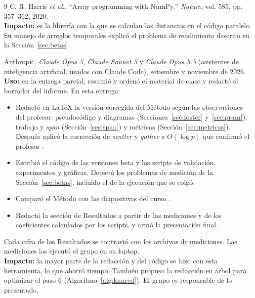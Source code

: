 \documentclass[11pt,a4paper]{article}
\begin{document}
\begin{thebibliography}{9}
 C. R. Harris \textit{et al.}, ``Array programming with NumPy,'' \textit{Nature}, vol. 585, pp. 357--362, 2020.\\
\textbf{Impacto:} es la librería con la que se calculan las distancias en el código paralelo. Su manejo de arreglos temporales explicó el problema de rendimiento descrito en la Sección~\ref{sec:betas}.

 Anthropic, \textit{Claude Opus 5}, \textit{Claude Sonnet 5} y \textit{Claude Opus 5.5} (asistentes de inteligencia artificial, usados con Claude Code), setiembre y noviembre de 2026.\\
\textbf{Uso:} en la entrega parcial, resumió y ordenó el material de clase y redactó el borrador del informe. En esta entrega:
\begin{itemize}
  \item Redactó en LaTeX la versión corregida del Método según las observaciones del profesor: pseudocódigo y diagramas (Secciones~\ref{sec:foster} y~\ref{sec:pram}), trabajo y \textit{span} (Sección~\ref{sec:span}) y métricas (Sección~\ref{sec:metricas}). Después aplicó la corrección de \textit{scatter} y \textit{gather} a $O(\log p)$ que confirmó el profesor \cite{correo-profesor}.
  \item Escribió el código de las versiones beta y los scripts de validación, experimentos y gráficas. Detectó los problemas de medición de la Sección~\ref{sec:betas}, incluido el de la ejecución que se colgó.
  \item Comparó el Método con las diapositivas del curso \cite{slides}.
  \item Redactó la sección de Resultados a partir de las mediciones y de los coeficientes calculados por los scripts, y armó la presentación final.
\end{itemize}
Cada cifra de los Resultados se contrastó con los archivos de mediciones. Las mediciones las ejecutó el grupo en su laptop.\\
\textbf{Impacto:} la mayor parte de la redacción y del código se hizo con esta herramienta, lo que ahorró tiempo. También propuso la reducción en árbol para optimizar el paso 6 (Algoritmo~\ref{alg:knnred}). El grupo es responsable de lo presentado.

\end{thebibliography}
\end{document}
